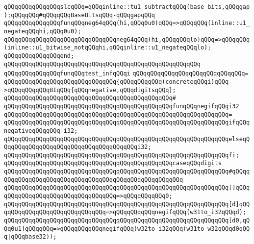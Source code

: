 \verb|qQQqqQQqqQQqqQQqslcqQQq=qQQqinline::tu1_subtractqQQq(base_bits,qQQqgap);qQQqqQQq#qQQqqQQqBaseBitsqQQq-qQQqgapqQQq|\newline
\newline
\verb|qQQqqQQqqQQqqQQqfunqQQqneg64qQQq(hi,qQQq0u0)qQQq=>qQQqqQQq(inline::u1_negateqQQqhi,qQQq0u0);|\newline
\verb|qQQqqQQqqQQqqQQqqQQqqQQqqQQqqQQqneg64qQQq(hi,qQQqqQQqlo)qQQq=>qQQqqQQq(inline::u1_bitwise_notqQQqhi,qQQqinline::u1_negateqQQqlo);|\newline
\verb|qQQqqQQqqQQqqQQqend;|\newline
\verb|qQQqqQQqqQQqqQQqqQQqqQQqqQQqqQQqqQQqqQQqqQQqqQQqqQQqqQQq|\newline
\verb|qQQqqQQqqQQqqQQqfunqQQqtest_infqQQqi|\newline
\verb|qQQqqQQqqQQqqQQqqQQqqQQqqQQqqQQq=|\newline
\verb|qQQqqQQqqQQqqQQqqQQqqQQqqQQqqQQq{qQQqqQQqqQQq(concreteqQQqi)qQQq->qQQqqQQqqQQqBIqQQq{qQQqnegative,qQQqdigitsqQQq};|\newline
\verb|qQQqqQQqqQQqqQQqqQQqqQQqqQQqqQQqqQQqqQQqqQQqqQQq#|\newline
\verb|qQQqqQQqqQQqqQQqqQQqqQQqqQQqqQQqqQQqqQQqqQQqqQQqfunqQQqnegifqQQqi32|\newline
\verb|qQQqqQQqqQQqqQQqqQQqqQQqqQQqqQQqqQQqqQQqqQQqqQQqqQQqqQQqqQQqqQQq=|\newline
\verb|qQQqqQQqqQQqqQQqqQQqqQQqqQQqqQQqqQQqqQQqqQQqqQQqqQQqqQQqqQQqqQQqifqQQqnegativeqQQqqQQq-i32;|\newline
\verb|qQQqqQQqqQQqqQQqqQQqqQQqqQQqqQQqqQQqqQQqqQQqqQQqqQQqqQQqqQQqqQQqelseqQQqqQQqqQQqqQQqqQQqqQQqqQQqqQQqqQQqqQQqi32;|\newline
\verb|qQQqqQQqqQQqqQQqqQQqqQQqqQQqqQQqqQQqqQQqqQQqqQQqqQQqqQQqqQQqqQQqfi;|\newline
\newline
\verb|qQQqqQQqqQQqqQQqqQQqqQQqqQQqqQQqqQQqqQQqqQQqqQQqcaseqQQqdigits|\newline
\verb|qQQqqQQqqQQqqQQqqQQqqQQqqQQqqQQqqQQqqQQqqQQqqQQqqQQqqQQqqQQqqQQq#qQQqqQQqqQQqqQQqqQQqqQQqqQQqqQQqqQQqqQQqqQQqqQQqqQQqqQQq|\newline
\verb|qQQqqQQqqQQqqQQqqQQqqQQqqQQqqQQqqQQqqQQqqQQqqQQqqQQqqQQqqQQqqQQq[]qQQqqQQqqQQqqQQqqQQqqQQqqQQqqQQqqQQq=>qQQqqQQqqQQq0;|\newline
\verb|qQQqqQQqqQQqqQQqqQQqqQQqqQQqqQQqqQQqqQQqqQQqqQQqqQQqqQQqqQQqqQQq[d]qQQqqQQqqQQqqQQqqQQqqQQqqQQqqQQq=>qQQqqQQqqQQqnegifqQQq(w31to_i32qQQqd);|\newline
\verb|qQQqqQQqqQQqqQQqqQQqqQQqqQQqqQQqqQQqqQQqqQQqqQQqqQQqqQQqqQQqqQQq[d0,qQQq0u1]qQQqqQQq=>qQQqqQQqqQQqnegifqQQq(w32to_i32qQQq(w31to_w32qQQqd0qQQq|\verb#|qQQqbase32));#\newline
